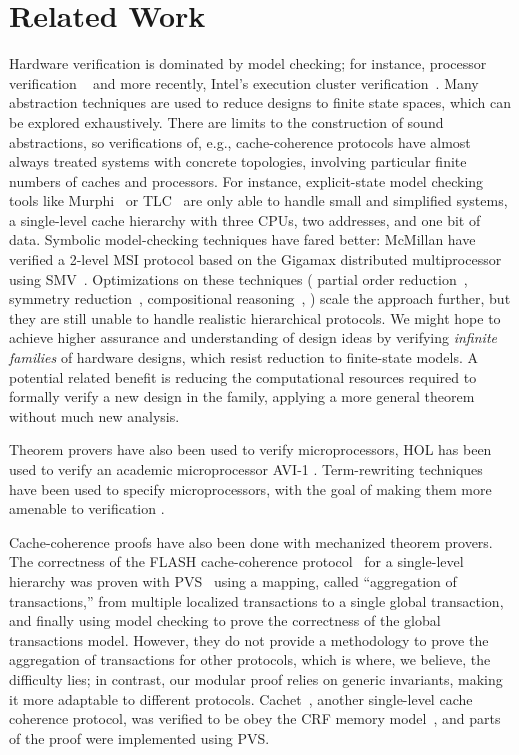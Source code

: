 ﻿\vspace{-.4cm}
\section{Related Work}
\label{relatedWork}

Hardware verification is dominated by model checking; for instance, processor
verification ~\cite{burch1994automatic, mcmillan1998verification} and more
recently, Intel's execution cluster verification~\cite{kaivola2009replacing}.
Many abstraction techniques are used to reduce designs to finite state spaces,
which can be explored exhaustively. There are limits to the construction of
sound abstractions, so verifications of, e.g., cache-coherence protocols have
almost always treated systems with concrete topologies, involving particular
finite numbers of caches and processors. For instance, explicit-state model
checking tools like Murphi~\cite{murphi} or TLC~\cite{tlc} are only able to
handle small and simplified systems, \eg{} a single-level cache hierarchy with
three CPUs, two addresses, and one bit of data. Symbolic model-checking
techniques have fared better: McMillan \etal{} have verified a 2-level MSI
protocol based on the Gigamax distributed multiprocessor using
SMV~\cite{gigamax}. Optimizations on these techniques (\eg{} partial order
reduction~\cite{part}, symmetry reduction~\cite{sym1, sym2}, compositional
reasoning~\cite{comp, Mccomp, mcc}, \etc{}) scale the approach further, but
they are still unable to handle realistic hierarchical protocols. We might hope
to achieve higher assurance and understanding of design ideas by verifying
\emph{infinite families} of hardware designs, which resist reduction to
finite-state models.  A potential related benefit is reducing the computational
resources required to formally verify a new design in the family, applying a
more general theorem without much new analysis.

Theorem provers have also been used to verify microprocessors, \eg{} HOL has
been used to verify an academic microprocessor AVI-1 \cite{windley1995formal}.
Term-rewriting techniques have been used to specify microprocessors, with
the goal of making them more amenable to verification \cite{shen1999using}.

Cache-coherence proofs have also been done with mechanized theorem provers. The
correctness of the FLASH cache-coherence protocol~\cite{flash} for a
single-level hierarchy was proven with PVS~\cite{park} using a mapping, called
``aggregation of transactions,'' from multiple localized transactions to a
single global transaction, and finally using model checking to prove the
correctness of the global transactions model. However, they do not provide a
methodology to prove the aggregation of transactions for other protocols, which
is where, we believe, the difficulty lies; in contrast, our modular proof
relies on generic invariants, making it more adaptable to different protocols.
Cachet~\cite{StoyShenArvind:Proofs}, another single-level cache coherence
protocol, was verified to be obey the CRF memory model~\cite{Shen:CRF}, and
parts of the proof were implemented using PVS.


